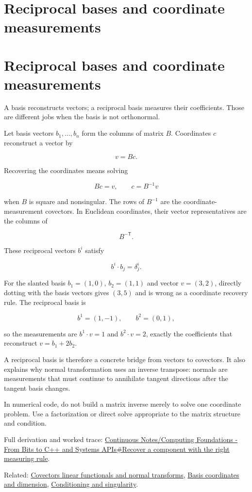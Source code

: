 \hypertarget{appendix-6b3d696dd902}{}
\section*{Reciprocal bases and coordinate measurements}
\section{Reciprocal bases and coordinate measurements}\label{appendix-6b3d696dd902-reciprocal-bases-and-coordinate-measurements}

A basis reconstructs vectors; a reciprocal basis measures their coefficients. Those are different jobs when the basis is not orthonormal.

Let basis vectors \(b_1,\ldots,b_n\) form the columns of matrix \(B\). Coordinates \(c\) reconstruct a vector by

\[
v=Bc.
\]

Recovering the coordinates means solving

\[
Bc=v,
\qquad c=B^{-1}v
\]

when \(B\) is square and nonsingular. The rows of \(B^{-1}\) are the coordinate-measurement covectors. In Euclidean coordinates, their vector representatives are the columns of

\[
B^{-\mathsf T}.
\]

These reciprocal vectors \(b^i\) satisfy

\[
b^i\cdot b_j=\delta^i_j.
\]

For the slanted basis \(b_1=(1,0)\), \(b_2=(1,1)\) and vector \(v=(3,2)\), directly dotting with the basis vectors gives \((3,5)\) and is wrong as a coordinate recovery rule. The reciprocal basis is

\[
b^1=(1,-1),\qquad b^2=(0,1),
\]

so the measurements are \(b^1\cdot v=1\) and \(b^2\cdot v=2\), exactly the coefficients that reconstruct \(v=b_1+2b_2\).

A reciprocal basis is therefore a concrete bridge from vectors to covectors. It also explains why normal transformation uses an inverse transpose: normals are measurements that must continue to annihilate tangent directions after the tangent basis changes.

In numerical code, do not build a matrix inverse merely to solve one coordinate problem. Use a factorization or direct solve appropriate to the matrix structure and condition.

Full derivation and worked trace: \hyperref[01-foundations-i-ch017-recover-a-component-with-the-right-measuring-rule]{Continuous Notes/Computing Foundations - From Bits to C++ and Systems APIs\#Recover a component with the right measuring rule}.

Related: \hyperref[appendix-46da295c6787]{Covectors linear functionals and normal transforms}, \hyperref[appendix-ce0341f7ea0d]{Basis coordinates and dimension}, \hyperref[appendix-8f6a01f284a7]{Conditioning and singularity}.

